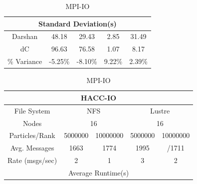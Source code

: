 \begin{table}[h]
\begin{subtable}[h]{0.5\textwidth}
\begin{tabular}{|ccccc|}
        \multicolumn{5}{|c|}{Standard Deviation(s)}                                                                                                 \\ \hline
        \multicolumn{1}{|c|}{Darshan}         & \multicolumn{1}{c|}{48.18}   & \multicolumn{1}{c|}{29.43}   & \multicolumn{1}{c|}{2.85}   & 31.49   \\ \hline
        \multicolumn{1}{|c|}{dC}              & \multicolumn{1}{c|}{96.63}   & \multicolumn{1}{c|}{76.58}   & \multicolumn{1}{c|}{1.07}   & 8.17    \\ \hline
        \multicolumn{1}{|c|}{\% Variance}     & \multicolumn{1}{c|}{-5.25\%} & \multicolumn{1}{c|}{-8.10\%} & \multicolumn{1}{c|}{9.22\%} & 2.39\%  \\ \hline
        \end{tabular}
    \caption{MPI-IO} 
    \label{subtable:mpi-io-test}
    \vspace{0.5cm}
    \end{subtable}
    \begin{subtable}[h]{0.5\textwidth}
        \centering
        \setlength\tabcolsep{5.5pt}
        \begin{tabular}{|ccccc|}
        \hline
        \multicolumn{5}{|c|}{HACC-IO}                                                                                                                    \\ \hline
        \multicolumn{1}{|c|}{File System}     & \multicolumn{2}{c|}{NFS}                                      & \multicolumn{2}{c|}{Lustre}              \\ \hline
        \multicolumn{1}{|c|}{Nodes}           & \multicolumn{2}{c|}{16}                                       & \multicolumn{2}{c|}{16}                  \\ \hline
        \multicolumn{1}{|c|}{Particles/Rank}  & \multicolumn{1}{c|}{5000000}  & \multicolumn{1}{c|}{10000000} & \multicolumn{1}{c|}{5000000}  & 10000000 \\ \hline
        \multicolumn{1}{|c|}{Avg. Messages}   & \multicolumn{1}{c|}{1663}     & \multicolumn{1}{c|}{1774}     & \multicolumn{1}{c|}{1995}     & /1711     \\ \hline
        \multicolumn{1}{|c|}{Rate (msgs/sec)} & \multicolumn{1}{c|}{2}        & \multicolumn{1}{c|}{1}        & \multicolumn{1}{c|}{3}        & 2        \\ \hline
        \multicolumn{5}{|c|}{Average Runtime(s)}                                                                                                        \\ \hline

\end{tabular}
\end{subtable}
\end{table}
